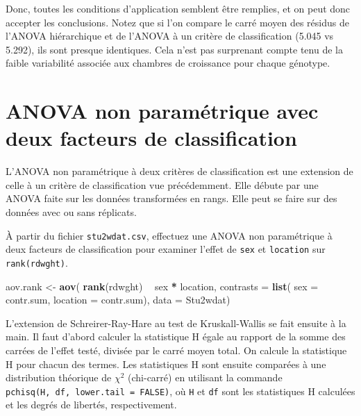 \documentclass[12pt,]{book}
\newenvironment{Shaded}{\begin{snugshade}}{\end{snugshade}}
\newcommand{\DataTypeTok}[1]{\textcolor[rgb]{0.27,0.27,0.27}{#1}}
\newcommand{\KeywordTok}[1]{\textcolor[rgb]{0.27,0.27,0.27}{\textbf{#1}}}
\newcommand{\NormalTok}[1]{#1}
\newcommand{\OperatorTok}[1]{\textcolor[rgb]{0.43,0.43,0.43}{\textbf{#1}}}
\newcommand{\StringTok}[1]{\textcolor[rgb]{0.5,0.5,0.5}{#1}}
\begin{document}
Donc, toutes les conditions d'application semblent être remplies, et on peut donc accepter les conclusions. Notez que si l'on compare le carré moyen des résidus de l'ANOVA hiérarchique et de l'ANOVA à un critère de classification (5.045 vs 5.292), ils sont presque identiques. Cela n'est pas surprenant compte tenu de la faible variabilité associée aux chambres de croissance pour chaque génotype.

\hypertarget{anova-non-paramuxe9trique-avec-deux-facteurs-de-classification}{%
\section{ANOVA non paramétrique avec deux facteurs de classification}\label{anova-non-paramuxe9trique-avec-deux-facteurs-de-classification}}

L'ANOVA non paramétrique à deux critères de classification est une extension de celle à un critère de classification vue précédemment. Elle débute par une ANOVA faite sur les données transformées en rangs. Elle peut se faire sur des données avec ou sans réplicats.

À partir du fichier \texttt{stu2wdat.csv}, effectuez une ANOVA non paramétrique à deux facteurs de classification pour examiner l'effet de \texttt{sex} et \texttt{location} sur \texttt{rank(rdwght)}.

\begin{Shaded}
\begin{Highlighting}[]
\NormalTok{aov.rank <-}\StringTok{ }\KeywordTok{aov}\NormalTok{(}
  \KeywordTok{rank}\NormalTok{(rdwght) }\OperatorTok{~}\StringTok{ }\NormalTok{sex }\OperatorTok{*}\StringTok{ }\NormalTok{location,}
  \DataTypeTok{contrasts =} \KeywordTok{list}\NormalTok{(}
    \DataTypeTok{sex =}\NormalTok{ contr.sum, }\DataTypeTok{location =}\NormalTok{ contr.sum),}
  \DataTypeTok{data =}\NormalTok{ Stu2wdat)}
\end{Highlighting}
\end{Shaded}

L'extension de Schreirer-Ray-Hare au test de Kruskall-Wallis se fait ensuite à la main. Il faut d'abord calculer la statistique H égale au rapport de la somme des carrées de l'effet testé, divisée par le carré moyen total. On calcule la statistique H pour chacun des termes. Les statistiques H sont ensuite comparées à une distribution théorique de \(\chi^2\) (chi-carré) en utilisant la commande \texttt{pchisq(H,\ df,\ lower.tail\ =\ FALSE)}, où \texttt{H} et \texttt{df} sont les statistiques H calculées et les degrés de libertés, respectivement.
\end{document}
